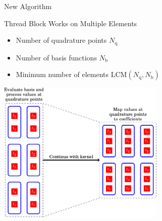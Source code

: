 

\begin{frame}{New Algorithm}

 \begin{block}{Thread Block Works on Multiple Elements}
  \begin{itemize}
   \item Number of quadrature points $N_\mathrm{q}$
   \item Number of basis functions $N_\mathrm{b}$
   \item Minimum number of elements $\mathrm{LCM}(N_\mathrm{q},N_\mathrm{b})$
  \end{itemize}
 \end{block}
 
 \begin{center}
  \includegraphics[width=0.6\textwidth]{figures/eval-1}
 \end{center}

\end{frame}



